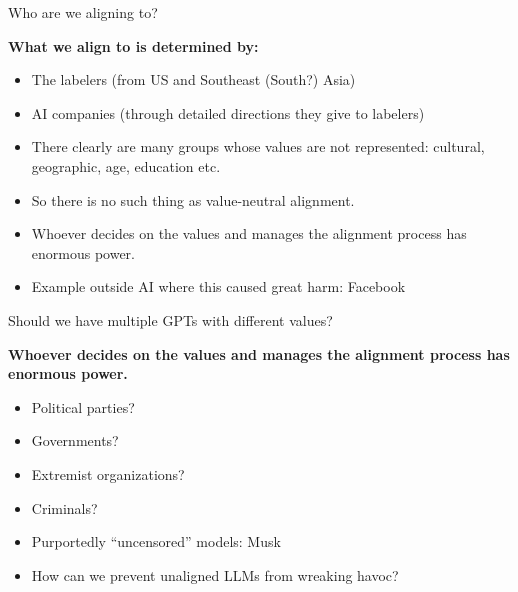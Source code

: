 \documentclass[11pt,compress,t,notes=noshow, xcolor=table]{beamer}
\def\myblue#1{\textcolor{texblue}{#1}}
\begin{document}
\begin{vbframe}{Who are we aligning to?}

\vfill

\textbf{What we align to is determined by:}

	\begin{itemize}
		\item The labelers (from US and Southeast
		(South?) Asia)
		\item AI companies (through detailed directions
		they give to labelers)
                \item There clearly are many groups whose
		values are not represented: cultural,
		geographic, age, education etc.
                \item So there is no such thing as
		value-neutral alignment.
                \item \myblue{Whoever decides on the values
		and manages the alignment process has
		enormous power.}
\item Example outside AI where this caused great harm: Facebook
	\end{itemize}

\vfill

\end{vbframe}

\begin{vbframe}{Should we have multiple GPTs with different values?}

\vfill

                \textbf{Whoever decides on the values
		and manages the alignment process has
		enormous power.}

	\begin{itemize}
		\item Political parties?
		\item Governments?
		\item Extremist organizations?
                \item Criminals?
                \item Purportedly ``uncensored'' models: Musk
                \item \ques How can we prevent unaligned
		LLMs from wreaking havoc?
	\end{itemize}

\vfill

\end{vbframe}
\end{document}
